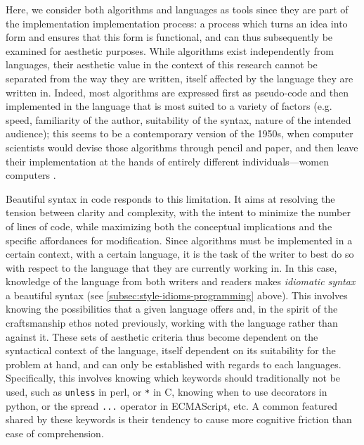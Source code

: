 Here, we consider both algorithms and languages as tools since they are part of the implementation implementation process: a process which turns an idea into form and ensures that this form is functional, and can thus subsequently be examined for aesthetic purposes. While algorithms exist independently from languages, their aesthetic value in the context of this research cannot be separated from the way they are written, itself affected by the language they are written in. Indeed, most algorithms are expressed first as pseudo-code and then implemented in the language that is most suited to a variety of factors (e.g. speed, familiarity of the author, suitability of the syntax, nature of the intended audience); this seems to be a contemporary version of the 1950s, when computer scientists would devise those algorithms through pencil and paper, and then leave their implementation at the hands of entirely different individuals—women computers \citep{chun_software_2005}.

Beautiful syntax in code responds to this limitation. It aims at resolving the tension between clarity and complexity, with the intent to minimize the number of lines of code, while maximizing both the conceptual implications and the specific affordances for modification. Since algorithms must be implemented in a certain context, with a certain language, it is the task of the writer to best do so with respect to the language that they are currently working in. In this case, knowledge of the language from both writers and readers makes \emph{idiomatic syntax} a beautiful syntax (see \autoref{subsec:style-idioms-programming} above). This involves knowing the possibilities that a given language offers and, in the spirit of the craftsmanship ethos noted previously, working with the language rather than against it. These sets of aesthetic criteria thus become dependent on the syntactical context of the language, itself dependent on its suitability for the problem at hand, and can only be established with regards to each languages. Specifically, this involves knowing which keywords should traditionally not be used, such as \lstinline{unless} in perl, or \lstinline{*} in C, knowing when to use decorators in python, or the spread \lstinline{...} operator in ECMAScript, etc. A common featured shared by these keywords is their tendency to cause more cognitive friction than ease of comprehension.

